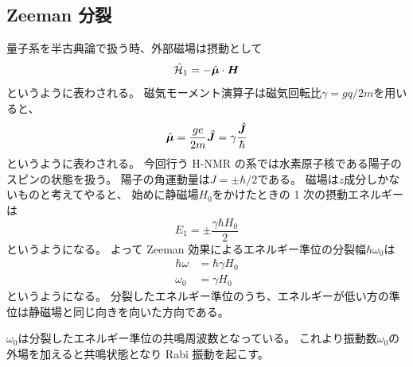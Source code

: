 \documentclass[11pt,dvipdfmx,a4paper]{jsarticle}
\begin{document}
\subsection{Zeeman 分裂}
量子系を半古典論で扱う時、外部磁場は摂動として
\begin{equation}
	\hat{\mathcal{H}}_1 = -\hat{\vb*{\mu}}\cdot \vb*{H}
\end{equation}
というように表わされる。
磁気モーメント演算子は磁気回転比\(\gamma = gq/2m\)を用いると、
\begin{equation}
	\hat{\vb*{\mu}} = \frac{ge}{2m}\hat{\vb*{J}} = \gamma\frac{\hat{\vb*{J}}}{\hbar}
\end{equation}
というように表わされる。
今回行う H-NMR の系では水素原子核である陽子のスピンの状態を扱う。
陽子の角運動量は\(J=\pm\hbar/2\)である。
磁場は\(z\)成分しかないものと考えてやると、
始めに静磁場\(H_0\)をかけたときの 1 次の摂動エネルギーは
\begin{equation}
	E_1 = \pm\frac{\gamma\hbar H_0}{2}
\end{equation}
というようになる。
よって Zeeman 効果によるエネルギー準位の分裂幅\(\hbar\omega_0\)は
\begin{align}
	\hbar\omega &= \hbar \gamma H_0\\
	\omega_0 &= \gamma H_0
\end{align}
というようになる。
分裂したエネルギー準位のうち、エネルギーが低い方の準位は静磁場と同じ向きを向いた方向である。

\(\omega_0\)は分裂したエネルギー準位の共鳴周波数となっている。
これより振動数\(\omega_0\)の外場を加えると共鳴状態となり Rabi 振動を起こす。
\end{document}
